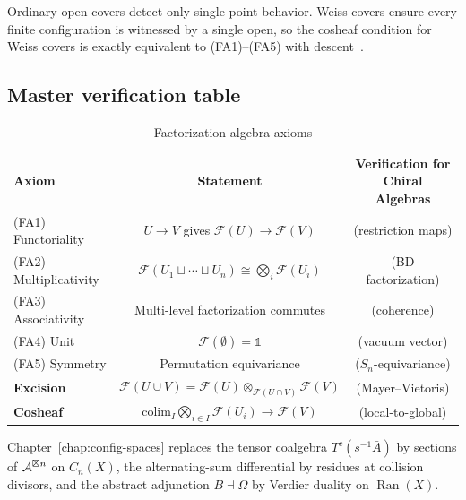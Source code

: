 \begin{remark}\label{rem:why-weiss}
Ordinary open covers detect only single-point behavior.  Weiss covers ensure every finite configuration is witnessed by a single open, so the cosheaf condition for Weiss covers is exactly equivalent to (FA1)--(FA5) with descent~\cite[Proposition~6.3.4]{CG17}.
\end{remark}

\subsection{Master verification table}

\begin{table}[H]
\centering
\caption{Factorization algebra axioms}
\begin{tabular}{|l|c|c|}
\hline
\textbf{Axiom} & \textbf{Statement} & \textbf{Verification for Chiral Algebras} \\
\hline
(FA1) Functoriality & $U \to V$ gives $\mathcal{F}(U) \to \mathcal{F}(V)$ & 
 (restriction maps) \\
\hline
(FA2) Multiplicativity & $\mathcal{F}(U_1 \sqcup \cdots \sqcup U_n) \cong 
\bigotimes_i \mathcal{F}(U_i)$ & (BD factorization) \\
\hline
(FA3) Associativity & Multi-level factorization commutes & (coherence) \\
\hline
(FA4) Unit & $\mathcal{F}(\emptyset) = \mathbb{1}$ & (vacuum vector) \\
\hline
(FA5) Symmetry & Permutation equivariance & ($S_n$-equivariance) \\
\hline
\textbf{Excision} & $\mathcal{F}(U \cup V) = \mathcal{F}(U) \otimes_{\mathcal{F}(U \cap V)} 
\mathcal{F}(V)$ & (Mayer--Vietoris) \\
\hline
\textbf{Cosheaf} & $\text{colim}_I \bigotimes_{i \in I} \mathcal{F}(U_i) \to 
\mathcal{F}(V)$ & (local-to-global) \\
\hline
\end{tabular}
\end{table}

Chapter~\ref{chap:config-spaces} replaces the tensor coalgebra $T^c(s^{-1}\bar{A})$ by sections of $\mathcal{A}^{\boxtimes n}$ on $\overline{C}_n(X)$, the alternating-sum differential by residues at collision divisors, and the abstract adjunction $\bar{B} \dashv \Omega$ by Verdier duality on $\operatorname{Ran}(X)$.
